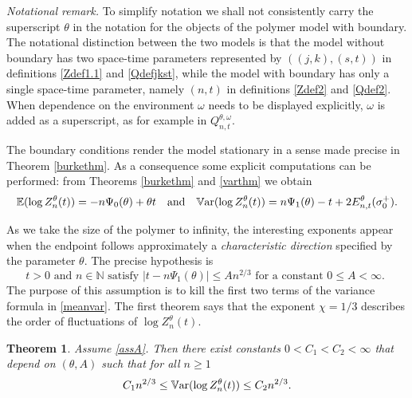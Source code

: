 \documentclass[11pt]{amsart}
\newtheorem{theorem}{\sc Theorem}[section]
\numberwithin{equation}{section}
\theoremstyle{remark}
\providecommand{\abs}[1]{\vert#1\vert}
\begin{document}
{\sl Notational remark.}   To simplify notation we shall not consistently 
carry the superscript ${\theta}$ in the notation for the objects of the polymer model
with boundary.  The notational distinction between the two models is that 
the model without boundary has two space-time parameters represented by $((j,k),(s,t))$   in
definitions \eqref{Zdef1.1} and \eqref{Qdefjkst}, while the model with boundary
has only a single space-time parameter, namely $(n,t)$ in definitions
\eqref{Zdef2} and \eqref{Qdef2}.  When dependence on the environment ${\omega}$ 
needs to be displayed explicitly, ${\omega}$ is added as a superscript,  as   for example in 
$Q^{{\theta},{\omega}}_{n,t}$.  
 
\medskip
 
The boundary conditions render the model stationary in a sense made precise
in Theorem \ref{burkethm}.  As a consequence some explicit computations can be
performed: from Theorems \ref{burkethm} and \ref{varthm} we obtain
\begin{equation}
{\mathbb{E}} (\log Z_n^{\theta}(t))=-n {\Psi_0}({\theta})+{\theta} t
\quad\text{and}\quad 
 {{\rm\mathbb{V}ar}}(\log Z_n^{\theta}(t)) = n{\Psi_1}({\theta})-t+2 E^{\theta}_{n,t}(\sigma_0^+).  
\label{meanvar}\end{equation}

As we take the size of the polymer to
infinity,  the interesting exponents appear when the  endpoint follows approximately a   {\sl characteristic direction}
specified by the parameter ${\theta}$.  The precise hypothesis is 
  \begin{equation} \text{$t>0$ and $n\in{\mathbb{N}}$ satisfy $\abs{t-n {\Psi_1}({\theta})}\le A n^{2/3} $  
  for a  constant $0\le A<\infty$. }   \label{assA}\end{equation} 
The purpose of this assumption is to kill the first two terms of the variance formula in
\eqref{meanvar}.
The first theorem says that the exponent  $\chi=1/3$
describes  the order of fluctuations of $\log Z_n^{\theta}(t)$.  

\begin{theorem}\label{varbdthm}  Assume \eqref{assA}.  
 Then there exist  constants $0<C_1 <C_2 <\infty$
 that depend on $({\theta}, A)$  such that for all
 $n\ge 1$ 
\begin{equation} 
C_1 n^{2/3} \le {{\rm\mathbb{V}ar}} (\log Z_n^{\theta}(t))\le  C_2 n^{2/3}.
\end{equation}
\end{theorem}
\end{document}
